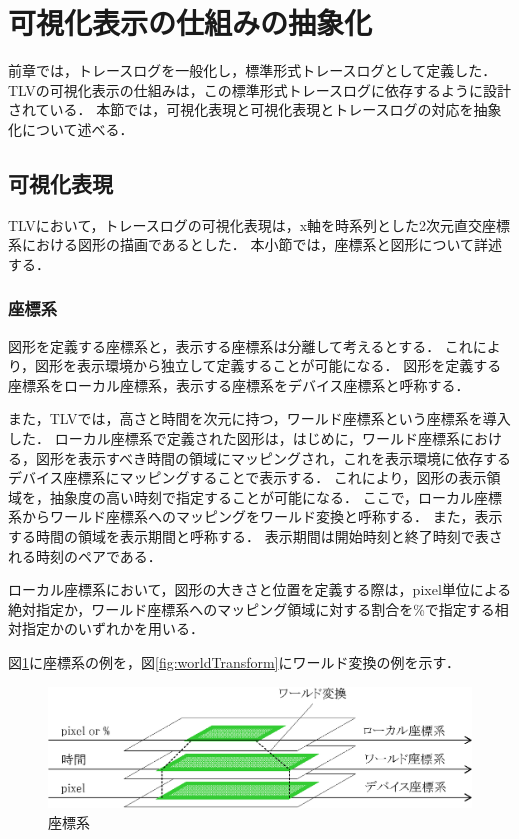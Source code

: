 \section{可視化表示の仕組みの抽象化}

前章では，トレースログを一般化し，標準形式トレースログとして定義した．
TLVの可視化表示の仕組みは，この標準形式トレースログに依存するように設計されている．
本節では，可視化表現と可視化表現とトレースログの対応を抽象化について述べる．

\subsection{可視化表現}
\label{subsec:visualization}

TLVにおいて，トレースログの可視化表現は，x軸を時系列とした2次元直交座標系における図形の描画であるとした．
本小節では，座標系と図形について詳述する．

\subsubsection{座標系}

図形を定義する座標系と，表示する座標系は分離して考えるとする．
これにより，図形を表示環境から独立して定義することが可能になる．
図形を定義する座標系をローカル座標系，表示する座標系をデバイス座標系と呼称する．

また，TLVでは，高さと時間を次元に持つ，ワールド座標系という座標系を導入した．
ローカル座標系で定義された図形は，はじめに，ワールド座標系における，図形を表示すべき時間の領域にマッピングされ，これを表示環境に依存するデバイス座標系にマッピングすることで表示する．
これにより，図形の表示領域を，抽象度の高い時刻で指定することが可能になる．
ここで，ローカル座標系からワールド座標系へのマッピングをワールド変換と呼称する．
また，表示する時間の領域を表示期間と呼称する．
表示期間は開始時刻と終了時刻で表される時刻のペアである．

ローカル座標系において，図形の大きさと位置を定義する際は，pixel単位による絶対指定か，ワールド座標系へのマッピング領域に対する割合を\%で指定する相対指定かのいずれかを用いる．

図\ref{fig:coordinate}に座標系の例を，図\ref{fig:worldTransform}にワールド変換の例を示す．

\begin{figure}[tb]
\begin{center}
\includegraphics[scale=0.75]{img/coordinate.eps}
\caption{座標系}
\label{fig:coordinate}
\end{center}
\end{figure}

